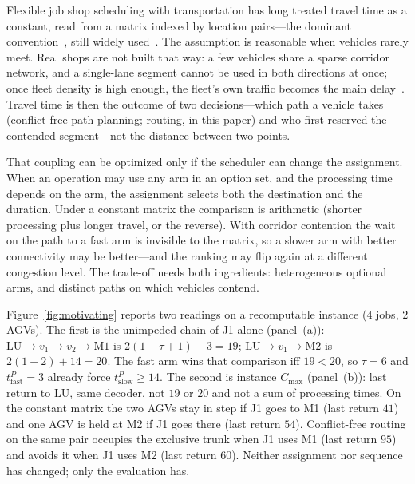 Flexible job shop scheduling with transportation has long treated travel time as a constant, read from a matrix indexed by location pairs---the dominant convention~\cite{xin2025review}, still widely used~\cite{meng2025cp,qin2026knowledge,fu2025integrated}.
The assumption is reasonable when vehicles rarely meet.
Real shops are not built that way: a few vehicles share a sparse corridor network, and a single-lane segment cannot be used in both directions at once; once fleet density is high enough, the fleet's own traffic becomes the main delay~\cite{kim2026congestion}.
Travel time is then the outcome of two decisions---which path a vehicle takes (conflict-free path planning; routing, in this paper) and who first reserved the contended segment---not the distance between two points.

That coupling can be optimized only if the scheduler can change the assignment.
When an operation may use any arm in an option set, and the processing time depends on the arm, the assignment selects both the destination and the duration.
Under a constant matrix the comparison is arithmetic (shorter processing plus longer travel, or the reverse).
With corridor contention the wait on the path to a fast arm is invisible to the matrix, so a slower arm with better connectivity may be better---and the ranking may flip again at a different congestion level.
The trade-off needs both ingredients: heterogeneous optional arms, and distinct paths on which vehicles contend.

Figure~\ref{fig:motivating} reports two readings on a recomputable instance ($4$ jobs, $2$ AGVs).
The first is the unimpeded chain of J1 alone (panel~(a)): $\mathrm{LU}\to v_1\to v_2\to\mathrm{M1}$ is $2(1+\tau+1)+3=19$; $\mathrm{LU}\to v_1\to\mathrm{M2}$ is $2(1+2)+14=20$.
The fast arm wins that comparison iff $19<20$, so $\tau=6$ and $t^P_{\text{fast}}=3$ already force $t^P_{\text{slow}}\ge 14$.
The second is instance $C_{\max}$ (panel~(b)): last return to LU, same decoder, not $19$ or $20$ and not a sum of processing times.
On the constant matrix the two AGVs stay in step if J1 goes to M1 (last return $41$) and one AGV is held at M2 if J1 goes there (last return $54$).
Conflict-free routing on the same pair occupies the exclusive trunk when J1 uses M1 (last return $95$) and avoids it when J1 uses M2 (last return $60$).
Neither assignment nor sequence has changed; only the evaluation has.

